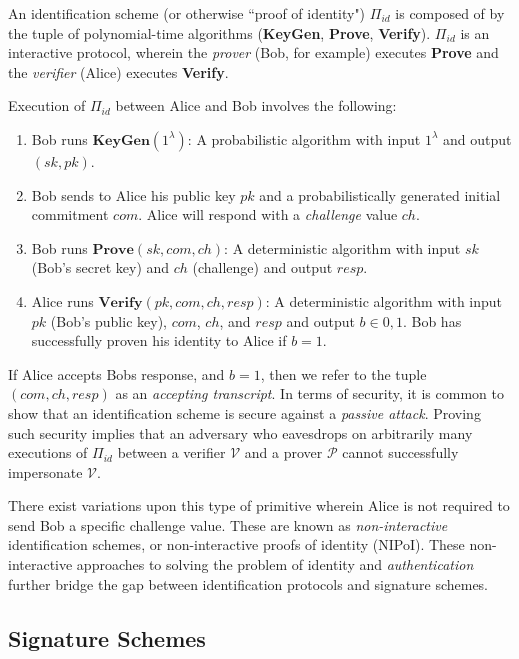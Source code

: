 An identification scheme (or otherwise ``proof of identity") $\Pi_{id}$ is composed of by the tuple of polynomial-time algorithms (\textbf{KeyGen}, \textbf{Prove}, \textbf{Verify}). $\Pi_{id}$ is an interactive protocol, wherein the \emph{prover} (Bob, for example) 
executes \textbf{Prove} and the \emph{verifier} (Alice) executes \textbf{Verify}.

Execution of $\Pi_{id}$ between Alice and Bob involves the following:
\begin{enumerate}[label=(\roman*)]
\item Bob runs $\textbf{KeyGen}(1^\lambda)$: A probabilistic algorithm with input $1^\lambda$ and output $(sk,pk)$. 
\item Bob sends to Alice his public key $pk$ and a probabilistically generated initial commitment $com$. Alice will respond with a \emph{challenge} value $ch$.
\item Bob runs $\textbf{Prove}(sk, com, ch)$: A deterministic algorithm with input $sk$ (Bob's secret key) and $ch$ (challenge) and output $resp$.
\item Alice runs $\textbf{Verify}(pk, com, ch, resp)$: A deterministic algorithm with input $pk$ (Bob's public key), $com$, $ch$, and $resp$ and output $b \in {0,1}$. Bob has successfully proven his identity to Alice if $b = 1$.
\end{enumerate}

If Alice accepts Bobs response, and $b = 1$, then we refer to the tuple $(com,ch,resp)$ as an \emph{accepting transcript}. In terms of security, it is common to show that an identification scheme is secure against a \emph{passive attack}. Proving such security implies that an adversary who eavesdrops on arbitrarily many executions of $\Pi_{id}$ between a verifier $\mathcal{V}$ and a prover $\mathcal{P}$ cannot successfully impersonate $\mathcal{V}$.

There exist variations upon this type of primitive wherein Alice is not required to send Bob a specific challenge value. These are known as \emph{non-interactive} identification schemes, or non-interactive proofs of identity (NIPoI). These non-interactive approaches to solving the problem of identity and \emph{authentication} further bridge the gap between identification protocols and signature schemes. 

\subsection{Signature Schemes}

